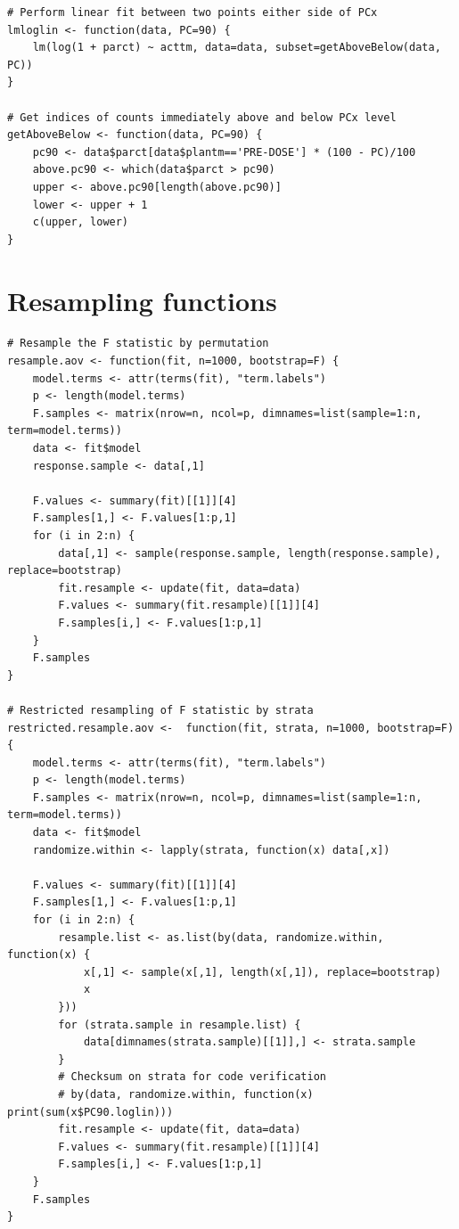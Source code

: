 \begin{singlespace}
\begin{lstlisting}[caption=Functions to find PC90 by log-linear interpolation,label=R:loglinear]
# Perform linear fit between two points either side of PCx
lmloglin <- function(data, PC=90) {
	lm(log(1 + parct) ~ acttm, data=data, subset=getAboveBelow(data, PC))
}

# Get indices of counts immediately above and below PCx level
getAboveBelow <- function(data, PC=90) {
	pc90 <- data$parct[data$plantm=='PRE-DOSE'] * (100 - PC)/100
	above.pc90 <- which(data$parct > pc90)
	upper <- above.pc90[length(above.pc90)]
	lower <- upper + 1
	c(upper, lower)
}
\end{lstlisting}

\section{Resampling functions}\label{R:resamp}
\begin{lstlisting}[caption=Functions for resampling $F$ statistic,label=R:Fresamp]
# Resample the F statistic by permutation
resample.aov <- function(fit, n=1000, bootstrap=F) {
	model.terms <- attr(terms(fit), "term.labels")
	p <- length(model.terms)
	F.samples <- matrix(nrow=n, ncol=p, dimnames=list(sample=1:n, term=model.terms))
	data <- fit$model
	response.sample <- data[,1]

	F.values <- summary(fit)[[1]][4]
	F.samples[1,] <- F.values[1:p,1]
	for (i in 2:n) {
		data[,1] <- sample(response.sample, length(response.sample), replace=bootstrap)
		fit.resample <- update(fit, data=data)
		F.values <- summary(fit.resample)[[1]][4]
		F.samples[i,] <- F.values[1:p,1]
	}
	F.samples	
}

# Restricted resampling of F statistic by strata
restricted.resample.aov <-  function(fit, strata, n=1000, bootstrap=F) {
	model.terms <- attr(terms(fit), "term.labels")
	p <- length(model.terms)
	F.samples <- matrix(nrow=n, ncol=p, dimnames=list(sample=1:n, term=model.terms))
	data <- fit$model
	randomize.within <- lapply(strata, function(x) data[,x])

	F.values <- summary(fit)[[1]][4]
	F.samples[1,] <- F.values[1:p,1]
	for (i in 2:n) {
		resample.list <- as.list(by(data, randomize.within, function(x) {
			x[,1] <- sample(x[,1], length(x[,1]), replace=bootstrap)
			x
		}))
		for (strata.sample in resample.list) {
			data[dimnames(strata.sample)[[1]],] <- strata.sample
		}
		# Checksum on strata for code verification
		# by(data, randomize.within, function(x) print(sum(x$PC90.loglin)))
		fit.resample <- update(fit, data=data)
		F.values <- summary(fit.resample)[[1]][4]
		F.samples[i,] <- F.values[1:p,1]
	}
	F.samples	
}
\end{lstlisting}


\end{singlespace}
